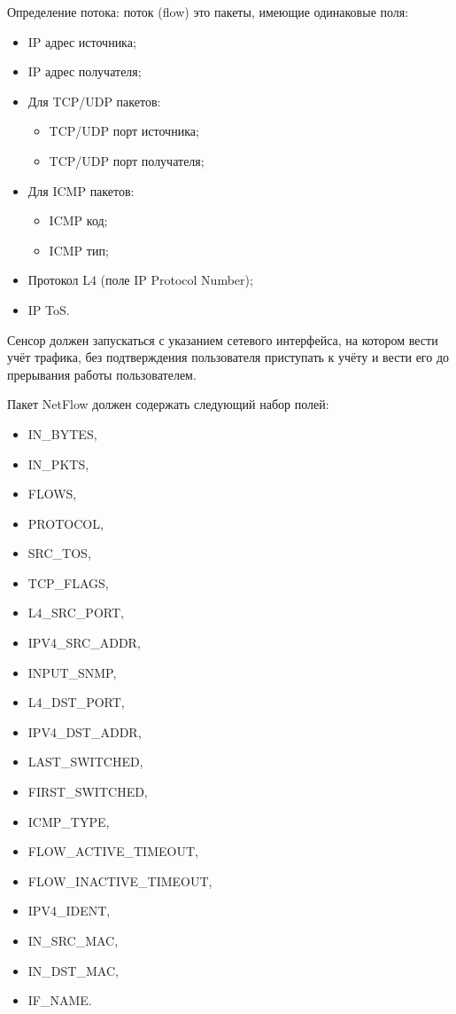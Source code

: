 Определение потока: поток (flow) это пакеты, имеющие одинаковые поля:
\begin{itemize}[wide, noitemsep]
    \item IP адрес источника;
    \item IP адрес получателя;
    \item Для TCP/UDP пакетов:
        \begin{itemize}[wide=\dimexpr\parindent+1.25cm, noitemsep]
            \item TCP/UDP порт источника;
            \item TCP/UDP порт получателя;
        \end{itemize}
    \item Для ICMP пакетов:
        \begin{itemize}[wide=\dimexpr\parindent+1.25cm, noitemsep]
            \item ICMP код;
            \item ICMP тип;
        \end{itemize}
    \item Протокол L4 (поле IP Protocol Number);
    \item IP ToS.
\end{itemize}        

\linespace

Сенсор должен запускаться с указанием сетевого интерфейса, на котором вести учёт трафика, без подтверждения пользователя приступать к учёту и вести его до прерывания работы пользователем.

\linespace

Пакет NetFlow должен содержать следующий набор полей:
\begin{itemize}[wide, noitemsep]
    \item IN\_BYTES,
    \item IN\_PKTS,
    \item FLOWS,
    \item PROTOCOL,
    \item SRC\_TOS,
    \item TCP\_FLAGS,
    \item L4\_SRC\_PORT,
    \item IPV4\_SRC\_ADDR,
    \item INPUT\_SNMP,
    \item L4\_DST\_PORT,
    \item IPV4\_DST\_ADDR,
    \item LAST\_SWITCHED,
    \item FIRST\_SWITCHED,
    \item ICMP\_TYPE,
    \item FLOW\_ACTIVE\_TIMEOUT,
    \item FLOW\_INACTIVE\_TIMEOUT,
    \item IPV4\_IDENT,
    \item IN\_SRC\_MAC,
    \item IN\_DST\_MAC,
    \item IF\_NAME.
\end{itemize}


